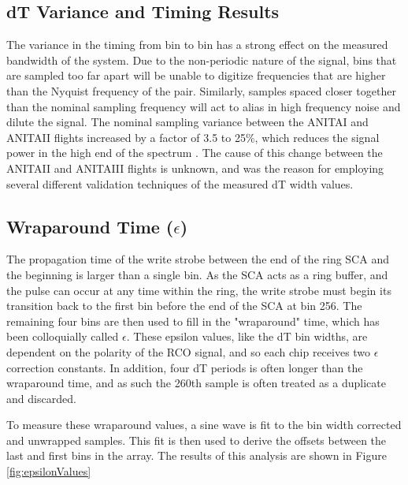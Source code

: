 	


	\subsection{dT Variance and Timing Results}	
		The variance in the timing from bin to bin has a strong effect on the measured bandwidth of the system.  Due to the non-periodic nature of the signal, bins that are sampled too far apart will be unable to digitize frequencies that are higher than the Nyquist frequency of the pair.  Similarly, samples spaced closer together than the nominal sampling frequency will act to alias in high frequency noise and dilute the signal.  The nominal sampling variance between the ANITAI and ANITAII flights increased by a factor of 3.5 to 25\%, which reduces the signal power in the high end of the spectrum .  The cause of this change between the ANITAII and ANITAIII flights is unknown, and was the reason for employing several different validation techniques of the measured dT width values.
		
		
	\subsection{Wraparound Time ($\epsilon$)}
		The propagation time of the write strobe between the end of the ring SCA and the beginning is larger than a single bin.  As the SCA acts as a ring buffer, and the pulse can occur at any time within the ring, the write strobe must begin its transition back to the first bin before the end of the SCA at bin 256.  The remaining four bins are then used to fill in the "wraparound" time, which has been colloquially called $\epsilon$.  These epsilon values, like the dT bin widths, are dependent on the polarity of the RCO signal, and so each chip receives two $\epsilon$ correction constants. In addition, four dT periods is often longer than the wraparound time, and as such the 260th sample is often treated as a duplicate and discarded.
		
		To measure these wraparound values, a sine wave is fit to the bin width corrected and unwrapped samples.  This fit is then used to derive the offsets between the last and first bins in the array.  The results of this analysis are shown in Figure \ref{fig:epsilonValues}
		
